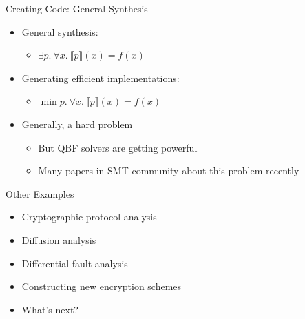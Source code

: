 \documentclass[ignorenonframetext,]{beamer}
\providecommand{\tightlist}{%
  \setlength{\itemsep}{0pt}\setlength{\parskip}{0pt}}
\begin{document}
\begin{frame}{Creating Code: General Synthesis}

\begin{itemize}
\tightlist
\item
  General synthesis:

  \begin{itemize}
  \tightlist
  \item
    \(\exists p.~\forall x.~\llbracket{}p\rrbracket{}(x) = f(x)\)
  \end{itemize}
\item
  Generating efficient implementations:

  \begin{itemize}
  \tightlist
  \item
    \(\min p.~\forall x.~\llbracket{}p\rrbracket{}(x) = f(x)\)
  \end{itemize}
\item
  Generally, a hard problem

  \begin{itemize}
  \tightlist
  \item
    But QBF solvers are getting powerful
  \item
    Many papers in SMT community about this problem recently
  \end{itemize}
\end{itemize}

\end{frame}

\begin{frame}{Other Examples}

\begin{itemize}
\item
  Cryptographic protocol analysis
\item
  Diffusion analysis
\item
  Differential fault analysis
\item
  Constructing new encryption schemes
\item
  What's next?
\end{itemize}

\end{frame}
\end{document}
